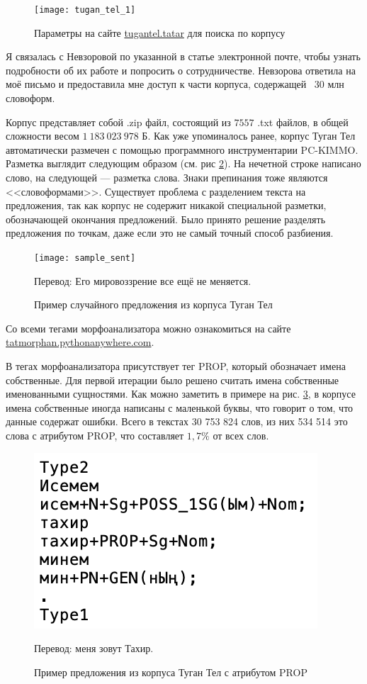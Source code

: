 \begin{figure}
\caption{Параметры на сайте \href{http://tugantel.tatar/}{tugantel.tatar} для поиска по корпусу}
\texttt{[image: tugan\_tel\_1]}
\label{fig:tugan_tel_1}
\end{figure}


Я связалась с Невзоровой по указанной в статье электронной почте, чтобы узнать подробности об их работе и попросить о сотрудничестве. Невзорова ответила на моё письмо и предоставила мне доступ к части корпуса, содержащей ~30 млн словоформ.

Корпус представляет собой .zip файл, состоящий из $7557$ .txt файлов, в общей сложности весом $1\ 183\ 023\ 978$ Б. Как уже упоминалось ранее, корпус Туган Тел автоматически размечен с помощью программного инструментарии PC-KIMMO. Разметка выглядит следующим образом (см. рис \ref{fig:sample_sent}). На нечетной строке написано слово, на следующей --- разметка слова. Знаки препинания тоже являются <<словоформами>>. Существует проблема с разделением текста на предложения, так как корпус не содержит никакой специальной разметки, обозначающей окончания предложений. Было принято решение разделять предложения по точкам, даже если это не самый точный способ разбиения.

\begin{figure}
\caption{Пример случайного предложения из корпуса Туган Тел}
\texttt{[image: sample\_sent]}
\label{fig:sample_sent}

Перевод: Его мировоззрение все ещё не меняется.
\end{figure}

Со всеми тегами морфоанализатора можно ознакомиться на сайте \\ \href{http://tatmorphan.pythonanywhere.com/morphan_tags}{tatmorphan.pythonanywhere.com}.

В тегах морфоанализатора присутствует тег PROP, который обозначает имена собственные. Для первой итерации было решено считать имена собственные именованными сущностями. Как можно заметить в примере на рис. \ref{fig:prop_sent}, в корпусе имена собственные иногда написаны с маленькой буквы, что говорит о том, что данные содержат ошибки.
Всего в текстах 30 753 824 слов, из них 534 514 это слова с атрибутом PROP, что составляет $1,7\%$ от всех слов. 

\begin{figure}
\caption{Пример предложения из корпуса Туган Тел с атрибутом PROP}
\includegraphics{pics/prop_sent}
\label{fig:prop_sent}

Перевод: меня зовут Тахир.
\end{figure}

